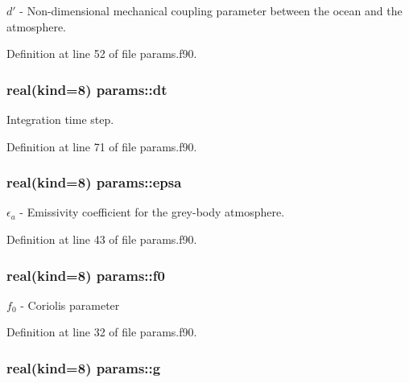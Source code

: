 $d'$ -\/ Non-\/dimensional mechanical coupling parameter between the ocean and the atmosphere. 



Definition at line 52 of file params.\-f90.

\hypertarget{classparams_a2d658dc74d6a45a2e71b06bde97df084}{
\subsubsection[{dt}]{\setlength{\rightskip}{0pt plus 5cm}real(kind=8) params\-::dt}}\label{classparams_a2d658dc74d6a45a2e71b06bde97df084}


Integration time step. 



Definition at line 71 of file params.\-f90.

\hypertarget{classparams_a10c96506a7d395bb9b15734461aef879}{
\subsubsection[{epsa}]{\setlength{\rightskip}{0pt plus 5cm}real(kind=8) params\-::epsa}}\label{classparams_a10c96506a7d395bb9b15734461aef879}


$\epsilon_a$ -\/ Emissivity coefficient for the grey-\/body atmosphere. 



Definition at line 43 of file params.\-f90.

\hypertarget{classparams_a83c176b3a593aa6ac77c50d2b5b21032}{
\subsubsection[{f0}]{\setlength{\rightskip}{0pt plus 5cm}real(kind=8) params\-::f0}}\label{classparams_a83c176b3a593aa6ac77c50d2b5b21032}


$f_0$ -\/ Coriolis parameter 



Definition at line 32 of file params.\-f90.

\hypertarget{classparams_afb5953f2f72e02fa67d474979127e79d}{
\subsubsection[{g}]{\setlength{\rightskip}{0pt plus 5cm}real(kind=8) params\-::g}}\label{classparams_afb5953f2f72e02fa67d474979127e79d}


